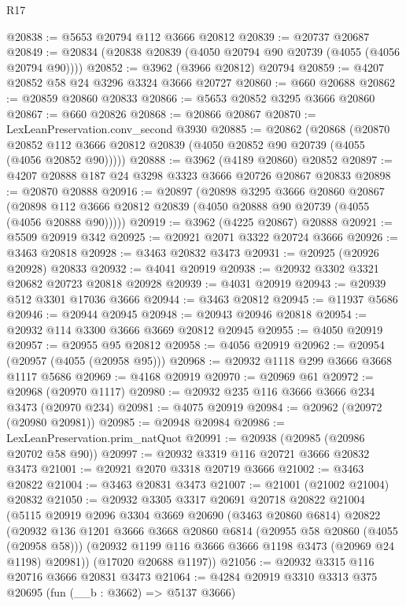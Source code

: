 \begin{lexlean}{R17}
\begin{coremodule}
@20838 := @5653 @20794 @112 @3666 @20812
@20839 := @20737 @20687
@20849 := @20834 (@20838 @20839 (@4050 @20794 @90 @20739 (@4055 (@4056 @20794 @90))))
@20852 := @3962 (@3966 @20812) @20794
@20859 := @4207 @20852 @58 @24 @3296 @3324 @3666 @20727
@20860 := @660 @20688
@20862 := @20859 @20860 @20833
@20866 := @5653 @20852 @3295 @3666 @20860
@20867 := @660 @20826
@20868 := @20866 @20867
@20870 := LexLeanPreservation.conv_second @3930
@20885 := @20862
    (@20868
      (@20870 @20852 @112 @3666 @20812 @20839 (@4050 @20852 @90 @20739 (@4055 (@4056 @20852 @90)))))
@20888 := @3962 (@4189 @20860) @20852
@20897 := @4207 @20888 @187 @24 @3298 @3323 @3666 @20726 @20867 @20833
@20898 := @20870 @20888
@20916 := @20897
    (@20898
      @3295
      @3666
      @20860
      @20867
      (@20898 @112 @3666 @20812 @20839 (@4050 @20888 @90 @20739 (@4055 (@4056 @20888 @90)))))
@20919 := @3962 (@4225 @20867) @20888
@20921 := @5509 @20919 @342
@20925 := @20921 @2071 @3322 @20724 @3666
@20926 := @3463 @20818
@20928 := @3463 @20832 @3473
@20931 := @20925 (@20926 @20928) @20833
@20932 := @4041 @20919
@20938 := @20932 @3302 @3321 @20682 @20723 @20818 @20928
@20939 := @4031 @20919
@20943 := @20939 @512 @3301 @17036 @3666
@20944 := @3463 @20812
@20945 := @11937 @5686
@20946 := @20944 @20945
@20948 := @20943 @20946 @20818
@20954 := @20932 @114 @3300 @3666 @3669 @20812 @20945
@20955 := @4050 @20919
@20957 := @20955 @95 @20812
@20958 := @4056 @20919
@20962 := @20954 (@20957 (@4055 (@20958 @95)))
@20968 := @20932 @1118 @299 @3666 @3668 @1117 @5686
@20969 := @4168 @20919
@20970 := @20969 @61
@20972 := @20968 (@20970 @1117)
@20980 := @20932 @235 @116 @3666 @3666 @234 @3473 (@20970 @234)
@20981 := @4075 @20919
@20984 := @20962 (@20972 (@20980 @20981))
@20985 := @20948 @20984
@20986 := LexLeanPreservation.prim_natQuot
@20991 := @20938 (@20985 (@20986 @20702 @58 @90))
@20997 := @20932 @3319 @116 @20721 @3666 @20832 @3473
@21001 := @20921 @2070 @3318 @20719 @3666
@21002 := @3463 @20822
@21004 := @3463 @20831 @3473
@21007 := @21001 (@21002 @21004) @20832
@21050 := @20932
    @3305
    @3317
    @20691
    @20718
    @20822
    @21004
    (@5115
      @20919
      @2096
      @3304
      @3669
      @20690
      (@3463 @20860 @6814)
      @20822
      (@20932
        @136
        @1201
        @3666
        @3668
        @20860
        @6814
        (@20955 @58 @20860 (@4055 (@20958 @58)))
        (@20932 @1199 @116 @3666 @3666 @1198 @3473 (@20969 @24 @1198) @20981))
      (@17020 @20688 @1197))
@21056 := @20932 @3315 @116 @20716 @3666 @20831 @3473
@21064 := @4284 @20919 @3310 @3313 @375 @20695 (fun (__b : @3662) => @5137 @3666)

\end{coremodule}
\end{lexlean}
